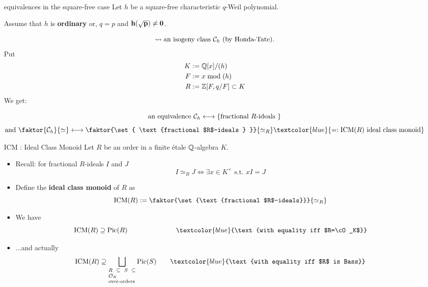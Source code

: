 \documentclass[usenames,dvipsnames]{beamer}
\begin{document}
\begin{frame}{ equivalences in the square-free case}
Let $h$ be a square-free characteristic $q$-Weil polynomial.

Assume that $h$ is \textbf{ordinary} or, $q=p$ and $\bf{h(\sqrt{p})\neq 0}$.

\[\rightsquigarrow \text{an isogeny class ${\mathcal C}_h$ (by Honda-Tate)}.\]
\pause Put
\begin{align*}
 K &:= \mathbb{Q}[x]/(h)\\
 F &:= x \bmod (h)\\
 R &:= \mathbb{Z}[F,q/F] \subset K
\end{align*}
\pause We get:
\begin{theorem}[M.]
\[ \text{an equivalence } {\mathcal C}_h \longleftrightarrow \left\lbrace \text{fractional $R$-ideals } \right\rbrace \]
\[ \text{and } \faktor{\cC_h}{\simeq} \longleftrightarrow \faktor{\set{ \text{fractional $R$-ideals } }}{\simeq_R} \textcolor{blue}{=:\ICM(R) \text{ ideal class monoid}} \]

\end{theorem}
\end{frame}

\begin{frame}{ICM : Ideal Class Monoid}
Let $R$ be an order in a finite \'etale  $\mathbb{Q}$-algebra $K$.
\begin{itemize}
   \pause \item Recall: for fractional $R$-ideals $I$ and $J$
    \[ I\simeq_R J \Longleftrightarrow \exists x \in K^\times \text{ s.t.~} xI=J \]
   \pause \item Define the \textbf{ideal class monoid} of $R$ as
    \[\ICM(R) := \faktor{\set{\text{fractional $R$-ideals}}}{\simeq_R}\]

   \pause \item We have
   \[ \ICM(R) \supseteq \Pic(R) \hspace{2.5 cm} \textcolor{blue}{\text{with equality iff $R=\cO_K$}} \]
   \pause \item ...and actually
   \[ \ICM(R) \supseteq \bigsqcup_{\scriptsize\parbox{5 em}{$R\subseteq S \subseteq \cO_K$\\over-orders}}\Pic(S) \qquad \textcolor{blue}{\text{with equality iff $R$ is Bass}} \]
\end{itemize}
\end{frame}
\end{document}
